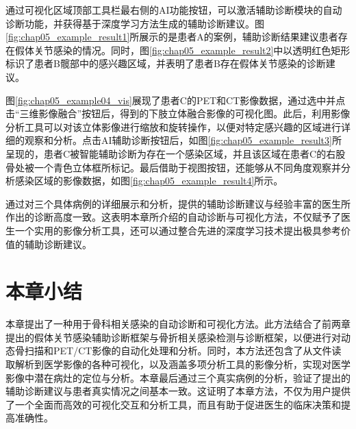 通过可视化区域顶部工具栏最右侧的AI功能按钮，可以激活辅助诊断模块的自动诊断功能，并获得基于深度学习方法生成的辅助诊断建议。图\ref{fig:chap05_example_result1}所展示的是患者A的案例，辅助诊断结果建议患者存在假体关节感染的情况。同时，图\ref{fig:chap05_example_result2}中以透明红色矩形标识了患者B髋部中的感兴趣区域，并表明了患者B存在假体关节感染的诊断建议。

图\ref{fig:chap05_example04_vis}展现了患者C的PET和CT影像数据，通过选中并点击“三维影像融合”按钮后，得到的下肢立体融合影像的可视化图。此后，利用影像分析工具可以对该立体影像进行缩放和旋转操作，以便对特定感兴趣的区域进行详细的观察和分析。点击AI辅助诊断按钮后，如图\ref{fig:chap05_example_result3}所呈现的，患者C被智能辅助诊断为存在一个感染区域，并且该区域在患者C的右股骨处被一个青色立体框所标记。最后借助于视图按钮，还能够从不同角度观察并分析感染区域的影像数据，如图\ref{fig:chap05_example_result4}所示。

通过对三个具体病例的详细展示和分析，提供的辅助诊断建议与经验丰富的医生所作出的诊断高度一致。这表明本章所介绍的自动诊断与可视化方法，不仅赋予了医生一个实用的影像分析工具，还可以通过整合先进的深度学习技术提出极具参考价值的辅助诊断建议。

\section{本章小结}

本章提出了一种用于骨科相关感染的自动诊断和可视化方法。此方法结合了前两章提出的假体关节感染辅助诊断框架与骨折相关感染检测与诊断框架，以便进行对动态骨扫描和PET/CT影像的自动化处理和分析。同时，本方法还包含了从文件读取解析到医学影像的各种可视化，以及涵盖多项分析工具的影像分析，实现对医学影像中潜在病灶的定位与分析。本章最后通过三个真实病例的分析，验证了提出的辅助诊断建议与患者真实情况之间基本一致。这证明了本章方法，不仅为用户提供了一个全面而高效的可视化交互和分析工具，而且有助于促进医生的临床决策和提高准确性。
